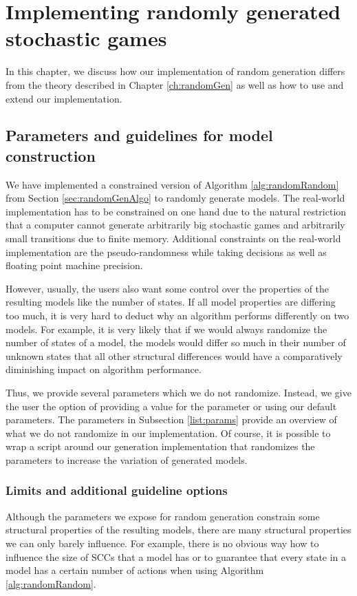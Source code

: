 \chapter{Implementing randomly generated stochastic games} \label{ch:implementedRandomGen}
In this chapter, we discuss how our implementation of random generation differs from the theory described in Chapter \ref{ch:randomGen} as well as how to use and extend our implementation. 

\section{Parameters and guidelines for model construction} \label{sec:guidelines}
We have implemented a constrained version of Algorithm \ref{alg:randomRandom} from Section \ref{sec:randomGenAlgo} to randomly generate models.
The real-world implementation has to be constrained on one hand due to the natural restriction that a computer cannot generate arbitrarily big stochastic games and 
arbitrarily small transitions due to finite memory. Additional constraints on the real-world implementation are the pseudo-randomness while taking decisions as well as
floating point machine precision.

However, usually, the users also want some control over the properties of the resulting models like the number of states.
If all model properties are differing too much, it is very hard to deduct why an algorithm performs differently on two models.
For example, it is very likely that if we would always randomize the number of states of a model, the models would differ so much in their number of unknown states that all other structural differences 
would have a comparatively diminishing impact on algorithm performance.

Thus, we provide several parameters which we do not randomize. Instead, we give the user the option of providing a value for the parameter or using our default parameters.
The parameters in Subsection \ref{list:params} provide an overview of what we do not randomize in our implementation.
Of course, it is possible to wrap a script around our generation implementation that randomizes the parameters to increase the variation of generated models.

\subsection*{Limits and additional guideline options} \label{sec:guidelinesSubsec}
Although the parameters we expose for random generation constrain some structural properties of the resulting models, 
there are many structural properties we can only barely influence. For example, there is no obvious way how to influence the size of SCCs that a model has or to guarantee
that every state in a model has a certain number of actions when using Algorithm \ref{alg:randomRandom}.

